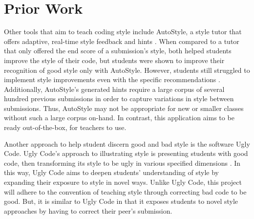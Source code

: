 \documentclass[10pt,twocolumn]{article}
\begin{document}
\section{Prior Work}
Other tools that aim to teach coding style include AutoStyle, a style tutor that offers adaptive, real-time style feedback and hints \cite{moghadam_2015}. 
When compared to a tutor that only offered the end score of a submission’s style, both helped students improve the style of their code, but students were shown to improve their recognition of good style only with AutoStyle. 
However, students still struggled to implement style improvements even with the specific recommendations \cite{wiese_2017}. 
Additionally, AutoStyle’s generated hints require a large corpus of several hundred previous submissions in order to capture variations in style between submissions. 
Thus, AutoStyle may not be appropriate for new or smaller classes without such a large corpus on-hand. 
In contrast, this application aims to be ready out-of-the-box, for teachers to use.

Another approach to help student discern good and bad style is the software Ugly Code.
Ugly Code's approach to illustrating style is presenting students with good code, then transforming its style to be ugly in various specified dimensions \cite{mcmaster_2013}. 
In this way, Ugly Code aims to deepen students' understanding of style by expanding their exposure to style in novel ways. 
Unlike Ugly Code, this project will adhere to the convention of teaching style through correcting bad code to be good. 
But, it is similar to Ugly Code in that it exposes students to novel style approaches by having to correct their peer's submission. 

\printbibliography 
\end{document}
